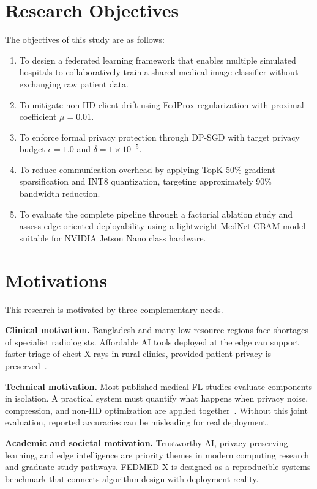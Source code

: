 \section{Research Objectives}
The objectives of this study are as follows:
\begin{enumerate}[label=(\roman*),leftmargin=*]
  \item To design a federated learning framework that enables multiple
        simulated hospitals to collaboratively train a shared medical image
        classifier without exchanging raw patient data.
  \item To mitigate non-IID client drift using FedProx regularization with
        proximal coefficient $\mu = 0.01$.
  \item To enforce formal privacy protection through DP-SGD with target
        privacy budget $\epsilon = 1.0$ and $\delta = 1 \times 10^{-5}$.
  \item To reduce communication overhead by applying TopK 50\% gradient
        sparsification and INT8 quantization, targeting approximately 90\%
        bandwidth reduction.
  \item To evaluate the complete pipeline through a factorial ablation study
        and assess edge-oriented deployability using a lightweight
        MedNet-CBAM model suitable for NVIDIA Jetson Nano class hardware.
\end{enumerate}

\section{Motivations}
This research is motivated by three complementary needs.

\textbf{Clinical motivation.} Bangladesh and many low-resource regions face
shortages of specialist radiologists. Affordable AI tools deployed at the edge
can support faster triage of chest X-rays in rural clinics, provided patient
privacy is preserved~\cite{vincent2026federated,shabarinath2025efficacy}.

\textbf{Technical motivation.} Most published medical FL studies evaluate
components in isolation. A practical system must quantify what happens when
privacy noise, compression, and non-IID optimization are applied
together~\cite{yesmin2025medhe,pachlasiya2026fedhealth}. Without this joint
evaluation, reported accuracies can be misleading for real deployment.

\textbf{Academic and societal motivation.} Trustworthy AI, privacy-preserving
learning, and edge intelligence are priority themes in modern computing
research and graduate study pathways. FEDMED-X is designed as a reproducible
systems benchmark that connects algorithm design with deployment reality.

